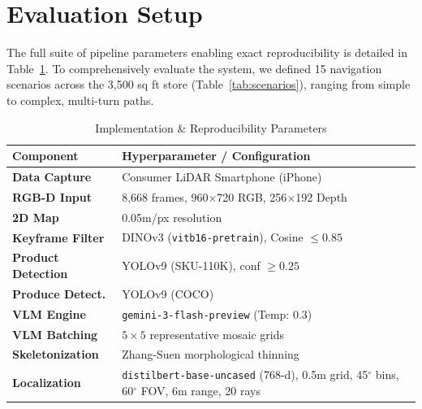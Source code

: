 \documentclass[sigconf,anonymous,review]{acmart}
\begin{document}
\section{Evaluation Setup}

The full suite of pipeline parameters enabling exact reproducibility is detailed in Table~\ref{tab:parameters}. To comprehensively evaluate the system, we defined 15 navigation scenarios across the 3,500 sq ft store (Table~\ref{tab:scenarios}), ranging from simple to complex, multi-turn paths.

\begin{table}[h]
\centering
\caption{Implementation \& Reproducibility Parameters}
\label{tab:parameters}
\small
\begin{tabularx}{\columnwidth}{@{}lX@{}}
\toprule
\textbf{Component} & \textbf{Hyperparameter / Configuration} \\
\midrule
\textbf{Data Capture} & Consumer LiDAR Smartphone (iPhone) \\
\textbf{RGB-D Input} & 8,668 frames, 960$\times$720 RGB, 256$\times$192 Depth \\
\textbf{2D Map} & 0.05m/px resolution \\
\textbf{Keyframe Filter} & DINOv3 (\texttt{vitb16-pretrain}), Cosine $\leq 0.85$ \\
\textbf{Product Detection} & YOLOv9 (SKU-110K), conf $\geq 0.25$ \\
\textbf{Produce Detect.} & YOLOv9 (COCO) \\
\textbf{VLM Engine} & \texttt{gemini-3-flash-preview} (Temp: 0.3) \\
\textbf{VLM Batching} & $5 \times 5$ representative mosaic grids \\
\textbf{Skeletonization} & Zhang-Suen morphological thinning \\
\textbf{Localization} & \texttt{distilbert-base-uncased} (768-d), 0.5m grid, 45$^\circ$ bins, 60$^\circ$ FOV, 6m range, 20 rays \\
\bottomrule
\end{tabularx}
\end{table}
\end{document}
